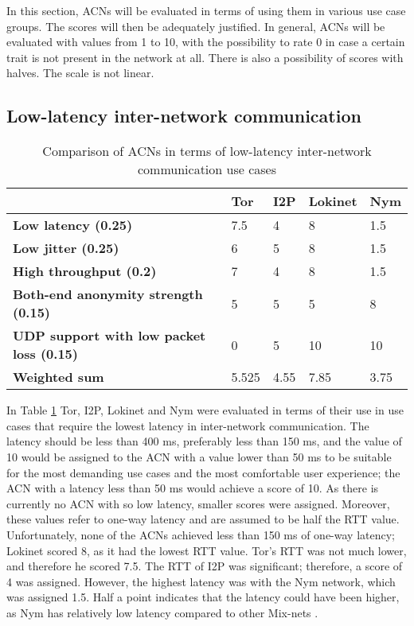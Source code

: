 In this section, ACNs will be evaluated in terms of using them in various use case groups. The scores will then be adequately justified. In general, ACNs will be evaluated with values from 1 to 10, with the possibility to rate 0 in case a certain trait is not present in the network at all. There is also a possibility of scores with halves. The scale is not linear.

\subsection{Low-latency inter-network communication}

\begin{table}[!ht]
\caption{Comparison of ACNs in terms of low-latency inter-network communication use cases}
\label{tab:low_latency_uc}
\small
\begin{tabular}{|p{}|p{}|p{}|p{}|p{}|}
\hline
\textbf{} & \textbf{Tor} & \textbf{I2P} & \textbf{Lokinet} & \textbf{Nym} \\
\hline
\textbf{Low latency (0.25)} & 7.5 & 4 & 8 & 1.5 \\
\hline
\textbf{Low jitter (0.25)} & 6 & 5 & 8 & 1.5 \\
\hline
\textbf{High throughput (0.2)} & 7 & 4 & 8 & 1.5 \\
\hline
\textbf{Both-end anonymity strength (0.15)} & 5 & 5 & 5 & 8 \\
\hline
\textbf{UDP support with low packet loss (0.15)} & 0 & 5 & 10 & 10 \\
\hline
\textbf{Weighted sum} & 5.525 & 4.55 & 7.85 & 3.75 \\
\hline
\end{tabular}
\end{table}

In Table \ref{tab:low_latency_uc} Tor, I2P, Lokinet and Nym were evaluated in terms of their use in use cases that require the lowest latency in inter-network communication. The latency should be less than 400 ms, preferably less than 150 ms, and the value of 10 would be assigned to the ACN with a value lower than 50 ms to be suitable for the most demanding use cases \cite{ITU-G.114} and the most comfortable user experience; the ACN with a latency less than 50 ms would achieve a score of 10. As there is currently no ACN with so low latency, smaller scores were assigned. Moreover, these values refer to one-way latency and are assumed to be half the RTT value. Unfortunately, none of the ACNs achieved less than 150 ms of one-way latency; Lokinet scored 8, as it had the lowest RTT value. Tor's RTT was not much lower, and therefore he scored 7.5. The RTT of I2P was significant; therefore, a score of 4 was assigned. However, the highest latency was with the Nym network, which was assigned 1.5. Half a point indicates that the latency could have been higher, as Nym has relatively low latency compared to other Mix-nets \cite{nym}.

